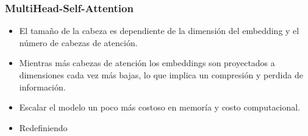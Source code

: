 \documentclass{beamer}
\begin{document}
\begin{frame}
\frametitle{MultiHead-Self-Attention}

\begin{itemize}
    \item El tamaño de la cabeza es dependiente de la dimensión del embedding y el número de cabezas
          de atención.
    \item Mientras más cabezas de atención los embeddings son proyectados a dimensiones cada vez
          más bajas, lo que implica un compresión y perdida de información.
    \item Escalar el modelo un poco más costoso en memoría y costo computacional.
    \item Redefiniendo
\end{itemize}

\end{frame}
\end{document}
